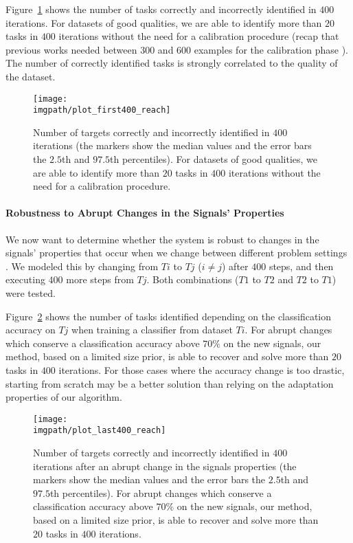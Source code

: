 Figure~\ref{fig:avg_sum_400} shows the number of tasks correctly and incorrectly identified in $400$ iterations. For datasets of good qualities, we are able to identify more than $20$ tasks in $400$ iterations without the need for a calibration procedure (recap that previous works needed between 300 and 600 examples for the calibration phase \cite{chavarriaga2010learning,iturrate2010single}). The number of correctly identified tasks is strongly correlated to the quality of the dataset.

\begin{figure}[!ht]
    \centering
    \texttt{[image: \\imgpath/plot\_first400\_reach]} 
    \caption{Number of targets correctly and incorrectly identified in $400$ iterations (the markers show the median values and the error bars the $2.5$th and $97.5$th percentiles). For datasets of good qualities, we are able to identify more than $20$ tasks in $400$ iterations without the need for a calibration procedure.}
    \label{fig:avg_sum_400}
\end{figure} 

\paragraph{Robustness to Abrupt Changes in the Signals' Properties }
\label{CenterRobustnessToAbruptChangesInTheSignalsProperties}

We now want to determine whether the system is robust to changes in the signals' properties that occur when we change between different problem settings \cite{iturrate2013task}. We modeled this by changing from $Ti$ to $Tj$ ($i \neq j$) after $400$ steps, and then executing $400$ more steps from $Tj$. Both combinations ($T1$ to $T2$ and $T2$ to $T1$) were tested.

Figure~\ref{fig:stage2} shows the number of tasks identified depending on the classification accuracy on $Tj$ when training a classifier from dataset $Ti$. For abrupt changes which conserve a classification accuracy above $70\%$ on the new signals, our method, based on a limited size prior, is able to recover and solve more than $20$ tasks in $400$ iterations. For those cases where the accuracy change is too drastic, starting from scratch may be a better solution than relying on the adaptation properties of our algorithm.

\begin{figure}[!ht]
    \centering
    \texttt{[image: \\imgpath/plot\_last400\_reach]}
    \caption{Number of targets correctly and incorrectly identified in $400$ iterations after an abrupt change in the signals properties (the markers show the median values and the error bars the $2.5$th and $97.5$th percentiles). For abrupt changes which conserve a classification accuracy above $70\%$ on the new signals, our method, based on a limited size prior, is able to recover and solve more than $20$ tasks in $400$ iterations.}
    \label{fig:stage2}
\end{figure}

